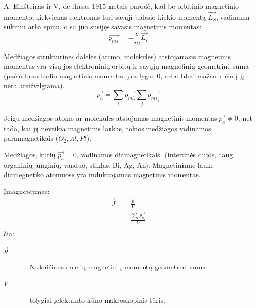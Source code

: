 A. Einšteinas ir V. de Hasas 1915 metais parodė, kad be orbitinio
magnetinio momento, kiekvienas elektronas turi savąjį judesio
kiekio momentą $\vec{L_{S}}$, vadinamą sukiniu arba spinu, o su
juo susijęs savasis magnetinis momentas:
\begin{equation*}
  \vec{p_{ms}} = -\frac{e}{m} \vec{L_{s}}
\end{equation*}

Medžiagos struktūrinės dalelės (atomo, molekulės) atstojamasis
magnetinis momentas yra visų jos elektroninių orbitų ir savųjų
magnetinių geometrinė suma (pačio branduolio magnetinis 
momentas yra lygus 0, arba labai mažas ir čia į jį nėra atsižvelgiama).
\begin{equation*}
  \vec{p_{a}} = \sum _{i} \vec{p_{ml_{i}}} \sum _{j} \vec{p_{ms_{j}}}
\end{equation*}

Jeigu medžiagos atomo ar molekulės atstojamas magnetinis momentas
$\vec{p_{a}} \neq 0$, net tada, kai jų neveikia magnetinis laukas,
tokios medžiagos vadinamos paramagnetikais ($O_{2}, Al, Pt$).

Medžiagos, kurių $\vec{p_{a}} = 0$, vadinamos diamagnetikais.
(Intertinės dujos, daug organinių junginių, vanduo, stiklas,
Bi, Ag, An). Magnetiniame lauke diamegnetiko atomuose yra indukuojamas
magnetinis momentas.

Įmagnetėjimas:
\begin{align*}
  \vec{J}
  &= \frac{\vec{p}}{V} \\
  &= \frac{\sum_{i} \vec{p_{a_{i}}}}{V} \\
\end{align*}
čia:
\begin{description}
  \item[$\vec{p}$] – N skaičiaus dalelių magnetinių momentų geometrinė
    suma;
  \item[$V$] – tolygiai įelektrinto kūno makroskopinis tūris.
\end{description}
